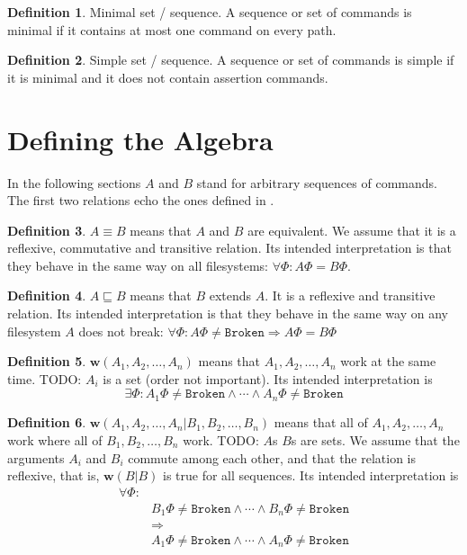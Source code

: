 \documentclass[12pt]{article}
\newcommand{\fsbroken}{\mathtt{Broken}} %
\newcommand{\FS}{\Phi} %
\newcommand{\eqext}{\sqsubseteq}
\newcommand{\works}[1]{{\mathbf{w}}({#1})}
\newcommand{\worksc}[2]{{\mathbf{w}}({#1}|{#2})}
\theoremstyle{definition}
\newtheorem{mydef}{Definition}
\begin{document}
\begin{mydef}{Minimal set / sequence.}
A sequence or set of commands is minimal if it contains at most one command on every path.
\end{mydef}

\begin{mydef}{Simple set / sequence.}
A sequence or set of commands is simple if it is minimal and it does not contain assertion commands.
\end{mydef}

\section{Defining the Algebra}

In the following sections $A$ and $B$ stand for arbitrary sequences of commands.
The first two relations echo the ones defined in \cite{NREC:alg}.

\begin{mydef}
$A\equiv B$ means that $A$ and $B$ are equivalent.
We assume that it is a reflexive, commutative and transitive relation.
Its intended interpretation is that they behave in the same way on
all filesystems: $\forall \FS: A\FS=B\FS$.
\end{mydef}

\begin{mydef}
$A\eqext B$ means that $B$ extends $A$.
It is a reflexive and transitive relation.
Its intended interpretation is that they behave in the same way
on any filesystem $A$ does not break:
$\forall \FS: A\FS\neq\fsbroken\Rightarrow A\FS=B\FS$
\end{mydef}

\begin{mydef}
$\works{A_1,A_2,\ldots,A_n}$ means that 
$A_1,A_2,\ldots,A_n$ work at the same time.
TODO: $A_i$ is a set (order not important).
Its intended interpretation is
\[\exists \FS: A_1\FS\neq\fsbroken \wedge \cdots \wedge A_n\FS\neq\fsbroken\]
\end{mydef}

\begin{mydef}
$\worksc{A_1,A_2,\ldots,A_n}{B_1,B_2,\ldots,B_n}$ means that 
all of $A_1,A_2,\ldots,A_n$ work where all of $B_1,B_2,\ldots,B_n$ work.
TODO: $A$s $B$s are sets.
We assume that the arguments $A_i$ and $B_i$ commute among each other,
and that the relation is reflexive, that is, $\worksc{B}{B}$ is true for all sequences.
Its intended interpretation is
\begin{align*}
\forall \FS:&\\ 
&B_1\FS\neq\fsbroken \wedge \cdots \wedge B_n\FS\neq\fsbroken\\
&\Rightarrow\\
&A_1\FS\neq\fsbroken \wedge \cdots \wedge A_n\FS\neq\fsbroken
\end{align*}
\end{mydef}
\end{document}
